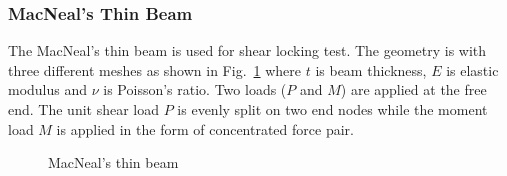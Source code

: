\documentclass[3p,sort&compress,review,11pt]{elsarticle}
\newcommand*{\figref}[1]{Fig.~\ref{#1}}
\begin{document}
\subsubsection{MacNeal's Thin Beam}
The MacNeal's thin beam \citep{MacNeal1985} is used for shear locking test. The geometry is  with three different meshes as shown in \figref{example:macneals_beam} where $t$ is beam thickness, $E$ is elastic modulus and $\nu$ is Poisson's ratio. Two loads ($P$ and $M$) are applied at the free end. The unit shear load $P$ is evenly split on two end nodes while the moment load $M$ is applied in the form of concentrated force pair.
\begin{figure}[H]
\centering\scriptsize
{}
\caption{MacNeal's thin beam}\label{example:macneals_beam}
\end{figure}
\end{document}
